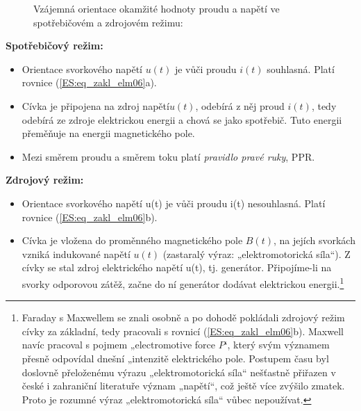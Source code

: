     \begin{figure}[ht!]
      \centering  
      \newline               
      \caption{Vzájemná orientace okamžité hodnoty proudu a napětí ve spotřebičovém a zdrojovém 
               režimu:} 
      \label{teo:fig039}
    \end{figure}
        
    \textbf{Spotřebičový režim:}
    \begin{itemize}[noitemsep]
      \item Orientace svorkového napětí \(u(t)\) je vůči proudu \(i(t)\) souhlasná. Platí rovnice
            (\ref{ES:eq_zakl_elm06}a).
      \item Cívka je připojena na zdroj napětí\(u(t)\), odebírá z něj proud \(i(t)\), tedy odebírá
            ze zdroje elektrickou energii a chová se jako spotřebič. Tuto energii přeměňuje na
            energii magnetického pole.
      \item Mezi směrem proudu a směrem toku platí \emph{pravidlo pravé ruky}, PPR.           
    \end{itemize}
    
    \textbf{Zdrojový režim:}
    \begin{itemize}[noitemsep]
      \item Orientace svorkového napětí u(t) je vůči proudu i(t) nesouhlasná. Platí rovnice
            (\ref{ES:eq_zakl_elm06}b).
      \item Cívka je vložena do proměnného magnetického pole \(B(t)\), na jejích svorkách vzniká
            indukované napětí \(u(t)\) (zastaralý výraz: „elektromotorická síla“). Z cívky se stal
            zdroj elektrického napětí u(t), tj. generátor. Připojíme-li na svorky odporovou zátěž,
            začne do ní generátor dodávat elektrickou energii.\footnote{Faraday s Maxwellem se
            znali osobně a po dohodě pokládali zdrojový režim cívky za základní, tedy pracovali s
            rovnicí (\ref{ES:eq_zakl_elm06}b). Maxwell navíc pracoval s pojmem „electromotive force
            \(P\)‘, který svým významem přesně odpovídal dnešní „intenzitě elektrického pole.
            Postupem času byl doslovně přeloženému výrazu „elektromotorická síla“ nešťastně
            přiřazen v české i zahraniční literatuře význam „napětí“, což ještě více zvýšilo
            zmatek. Proto je rozumné výraz „elektromotorická síla“ vůbec nepoužívat.}
    \end{itemize}

